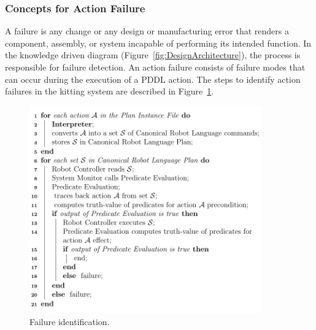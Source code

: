 \subsubsection{Concepts for Action Failure}\label{sss:failure}
 A failure is any change or any design or manufacturing error that renders a component, assembly, or system incapable of performing its intended function. In the knowledge driven diagram (Figure~\ref{fig:DesignArchitecture}), the  process is responsible for failure detection. An action failure consists of failure modes that can occur during the execution of a PDDL action. The steps to identify action failures in the kitting system are described in Figure~\ref{fig:algo}.

\begin{figure}[h!t!]
  \centering
  \includegraphics[width=10cm]{images/algorithm.pdf}
  \caption{Failure identification.}
  \label{fig:algo}
\end{figure}

